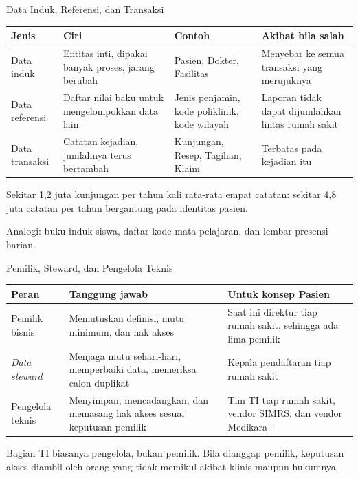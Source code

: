 \documentclass[aspectratio=169, table, 12pt]{beamer}
\begin{document}
\begin{frame}{{\Large Data Induk, Referensi, dan Transaksi}}
  \scriptsize
  \begin{tabularx}{\textwidth}{lXXX}
    \hline
    \textbf{Jenis} & \textbf{Ciri} & \textbf{Contoh} & \textbf{Akibat bila salah} \\
    \hline
    Data induk & Entitas inti, dipakai banyak proses, jarang berubah &
      Pasien, Dokter, Fasilitas & Menyebar ke semua transaksi yang merujuknya \\
    \hline
    Data referensi & Daftar nilai baku untuk mengelompokkan data lain &
      Jenis penjamin, kode poliklinik, kode wilayah &
      Laporan tidak dapat dijumlahkan lintas rumah sakit \\
    \hline
    Data transaksi & Catatan kejadian, jumlahnya terus bertambah &
      Kunjungan, Resep, Tagihan, Klaim & Terbatas pada kejadian itu \\
    \hline
  \end{tabularx}

  \vspace{8pt}
  \small Sekitar 1,2 juta kunjungan per tahun kali rata-rata empat catatan: sekitar 4,8 juta catatan per
  tahun bergantung pada identitas pasien.

  \vspace{6pt}
  Analogi: buku induk siswa, daftar kode mata pelajaran, dan lembar presensi harian.
\end{frame}

\begin{frame}{{\Large Pemilik, Steward, dan Pengelola Teknis}}
  \scriptsize
  \begin{tabularx}{\textwidth}{lXX}
    \hline
    \textbf{Peran} & \textbf{Tanggung jawab} & \textbf{Untuk konsep Pasien} \\
    \hline
    Pemilik bisnis & Memutuskan definisi, mutu minimum, dan hak akses &
      Saat ini direktur tiap rumah sakit, sehingga ada lima pemilik \\
    \hline
    \textit{Data steward} & Menjaga mutu sehari-hari, memperbaiki data, memeriksa
      calon duplikat & Kepala pendaftaran tiap rumah sakit \\
    \hline
    Pengelola teknis & Menyimpan, mencadangkan, dan memasang hak akses sesuai
      keputusan pemilik & Tim TI tiap rumah sakit, vendor SIMRS, dan vendor
      Medikara+ \\
    \hline
  \end{tabularx}

  \vspace{8pt}
  \small Bagian TI biasanya pengelola, bukan pemilik. Bila dianggap pemilik, keputusan akses diambil oleh
  orang yang tidak memikul akibat klinis maupun hukumnya.
\end{frame}
\end{document}
